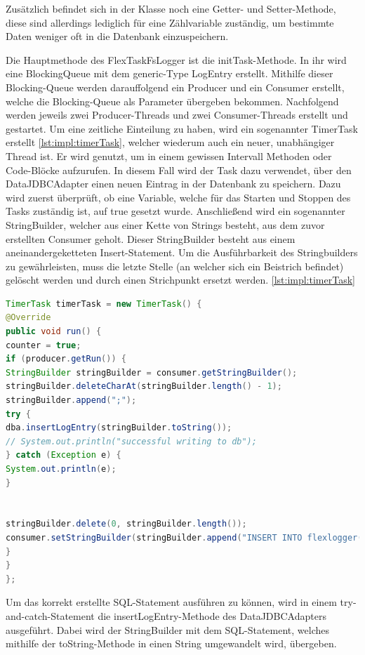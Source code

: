 Zusätzlich befindet sich in der Klasse noch eine Getter- und Setter-Methode, diese sind allerdings lediglich für eine Zählvariable zuständig, um bestimmte Daten weniger oft in die Datenbank einzuspeichern.


Die Hauptmethode des FlexTaskFsLogger ist die initTask-Methode. In ihr wird eine BlockingQueue mit dem generic-Type LogEntry erstellt. Mithilfe dieser Blocking-Queue werden darauffolgend ein Producer und ein Consumer erstellt, welche die Blocking-Queue als Parameter übergeben bekommen. Nachfolgend werden jeweils zwei Producer-Threads und zwei Consumer-Threads erstellt und gestartet. Um eine zeitliche Einteilung zu haben, wird ein sogenannter TimerTask erstellt \ref{lst:impl:timerTask}, welcher wiederum auch ein neuer, unabhängiger Thread ist. Er wird genutzt, um in einem gewissen Intervall Methoden oder Code-Blöcke aufzurufen. In diesem Fall wird der Task dazu verwendet, über den DataJDBCAdapter einen neuen Eintrag in der Datenbank zu speichern. Dazu wird zuerst überprüft, ob eine Variable, welche für das Starten und Stoppen des Tasks zuständig ist, auf true gesetzt wurde. Anschließend wird ein sogenannter StringBuilder, welcher aus einer Kette von Strings besteht, aus dem zuvor erstellten Consumer geholt. Dieser StringBuilder besteht aus einem aneinandergeketteten Insert-Statement. Um die Ausführbarkeit des Stringbuilders zu gewährleisten, muss die letzte Stelle (an welcher sich ein Beistrich befindet) gelöscht werden und durch einen Strichpunkt ersetzt werden. \ref{lst:impl:timerTask}



\begin{lstlisting}[language=java,caption=TimerTask,label=lst:impl:timerTask]
TimerTask timerTask = new TimerTask() {
@Override
public void run() {
counter = true;
if (producer.getRun()) {
StringBuilder stringBuilder = consumer.getStringBuilder();
stringBuilder.deleteCharAt(stringBuilder.length() - 1);
stringBuilder.append(";");
try {
dba.insertLogEntry(stringBuilder.toString());
// System.out.println("successful writing to db");
} catch (Exception e) {
System.out.println(e);
}


stringBuilder.delete(0, stringBuilder.length());
consumer.setStringBuilder(stringBuilder.append("INSERT INTO flexlogger(dp_name, value, unit, timestamp) VALUES "));
}
}
};
\end{lstlisting}


Um das korrekt erstellte SQL-Statement ausführen zu können, wird in einem try-and-catch-Statement die insertLogEntry-Methode des DataJDBCAdapters ausgeführt. Dabei wird der StringBuilder mit dem SQL-Statement, welches mithilfe der toString-Methode in einen String umgewandelt wird, übergeben.


